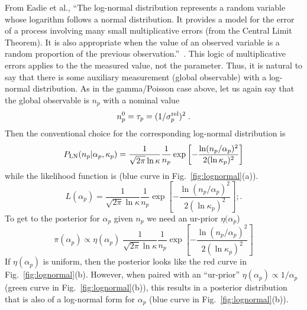 \documentclass{cernrep}
\newcommand{\LN}{{\ensuremath{P_{\rm LN}}}}
\begin{document}
From Eadie et al., ``The log-normal distribution represents a random variable whose logarithm follows a normal distribution. It provides a model for the error of a process involving many small multiplicative errors (from the Central Limit Theorem). It is also appropriate when the value of an observed variable is a random proportion of the previous observation.''~\cite{Eadie:qy,CousinsLogNormal}.  This logic of multiplicative errors applies to the the measured value, not the parameter.  Thus, it is natural to say that there is some auxiliary measurement (global observable) with a log-normal distribution.  As in the gamma/Poisson case above, let us again say that the global observable is $n_p$ with a nominal value
\begin{equation}
n_p^0 =  \tau_p = (1/\sigma_{p}^{\rm rel})^2\; .
\end{equation}
Then the conventional choice for the corresponding log-normal distribution is
\begin{equation}
\LN(n_p | \alpha_p, \kappa_p) = \frac{1}{\sqrt{2\pi}\ln \kappa}\frac{1}{n_p} \exp \left[ -\frac{\ln(n_p/ \alpha_p)^2}{2(\ln \kappa_p)^2} \right]
\end{equation}
while the likelihood function is (blue curve in Fig.~\ref{fig:lognormal}(a)).
\begin{equation}
L( \alpha_p) = \frac{1}{\sqrt{2\pi}\ln \kappa}\frac{1}{n_p} \exp \left[ -\frac{\ln(n_p/ \alpha_p)^2}{2(\ln \kappa_p)^2} \right];.
\end{equation}
To get to the posterior for $\alpha_p$ given $n_p$ we need an ur-prior $\eta(\alpha_p$)
\begin{equation}
\pi( \alpha_p) \propto \eta(\alpha_p)  \; \frac{1}{\sqrt{2\pi}\ln \kappa}\frac{1}{n_p} \exp \left[ -\frac{\ln(n_p/ \alpha_p)^2}{2(\ln \kappa_p)^2} \right]
\end{equation}
If $\eta(\alpha_p)$ is uniform, then the posterior looks like the red curve in Fig.~\ref{fig:lognormal}(b).  However, when paired with an ``ur-prior'' $\eta(\alpha_p) \propto 1/\alpha_p$ (green curve in Fig.~\ref{fig:lognormal}(b)), this results in a posterior distribution that is also of a log-normal form for $\alpha_p$ (blue curve in Fig.~\ref{fig:lognormal}(b)).
\end{document}

